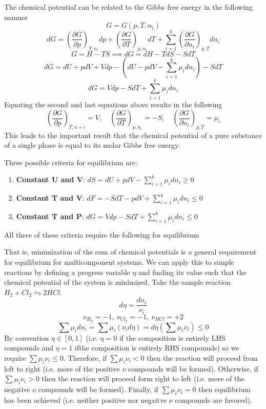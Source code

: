 \documentclass[11pt]{article}
\newcommand{\Item}[1]{\item \textbf{#1}:}
\newcommand{\CenteredBoxed}[1]{\begin{center}\boxed{#1}\end{center}}
\newcommand{\sumlim}[2]{\sum\limits_{#1}^{#2}}
\newcommand{\Partial}[2]{\frac{\partial #1}{\partial #2}}
\newcommand{\PartialConst}[3]{\left(\Partial{#1}{#2}\right)_{#3}}
\begin{document}
The chemical potential can be related to the Gibbs free energy in the following manner
$$G = G(p,T,n_i)$$
$$dG = \PartialConst{G}{p}{T,n_i}dp + \PartialConst{G}{T}{p,n_i}dT + \sumlim{i=1}{k}\PartialConst{G}{n_i}{p,T}dn_i$$
$$G = H - TS \implies dG = dH - TdS - SdT $$
$$dG = dU + pdV + Vdp - \left(dU - pdV -\sumlim{i=1}{k}\mu_idn_i\right) - SdT$$
$$dG = Vdp - SdT + \sumlim{i=1}{k}\mu_idn_i$$
Equating the second and last equations above results in the following
$$\PartialConst{G}{p}{T,n+i}=V,\quad\PartialConst{G}{T}{p,n_i}=-S,\quad\PartialConst{G}{n_i}{p,T}=\mu_i$$
This leads to the important result that the chemical potential of a pure substance of a single phase is equal to its molar Gibbs free energy.

Three possible criteria for equilibrium are:
\begin{enumerate}
\Item{Constant U and V} $dS = dU + pdV - \sumlim{i=1}{k}\mu_idn_i \geq 0$
\Item{Constant T and V} $dF = -SdT - pdV + \sumlim{i=1}{k}\mu_idn_i \leq 0$
\Item{Constant T and P} $dG = Vdp - SdT + \sumlim{i=1}{k}\mu_idn_i \leq 0$
\end{enumerate}
All three of these criteria require the following for equilibrium
\CenteredBoxed{\sumlim{i=1}{k}\mu_idn_i \leq 0}
That is, minimization of the sum of chemical potentials is a general requirement for equilibrium for multicomponent systems. We can apply this to simple reactions by defining a progress variable $\eta$ and finding its value such that the chemical potential of the system is minimized. Take the sample reaction $H_2 + Cl_2 \leftrightharpoons 2HCl$.
$$d\eta = \frac{dn_i}{\nu_i}$$
$$\nu_{H_2} = -1,\ \nu_{Cl_2} = -1,\ \nu_{HCl} = +2$$ 
$$\sum\mu_idn_i=\sum\mu_i(\nu_id\eta)=d\eta\left(\sum\mu_i\nu_i\right)\leq0$$
By convention $\eta\in[0,1]$ (i.e. $\eta=0$ if the composition is entirely LHS compounds and $\eta=1$ ifthe composition is entirely RHS compounds) so we require $\sum\mu_i\nu_i\leq0$. Therefore, if $\sum\mu_i\nu_i<0$ then the reaction will proceed from left to right (i.e. more of the positive $\nu$ compounds will be formed). Otherwise, if $\sum\mu_i\nu_i>0$ then the reaction will proceed form right to left (i.e. more of the negative $\nu$ compounds will be formed). Finally, if $\sum\mu_i\nu_i=0$ then equilibrium has been achieved (i.e. neither positive nor negaitve $\nu$ compounds are favored).
\end{document}
